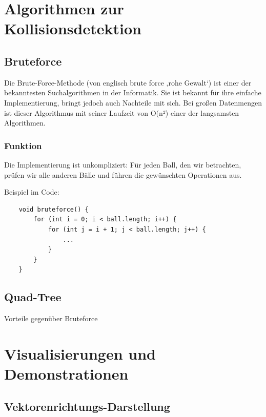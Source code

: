 \documentclass[12pt,a4paper]{article}
\begin{document}
		

		
	
	\section{Algorithmen zur Kollisionsdetektion}
	
\subsection{Bruteforce}

Die Brute-Force-Methode (von englisch brute force ‚rohe Gewalt‘) \cite{Bruteforce} ist einer der bekanntesten Suchalgorithmen in der Informatik. Sie ist bekannt für ihre einfache Implementierung, bringt jedoch auch Nachteile mit sich. Bei großen Datenmengen ist dieser Algorithmus mit seiner Laufzeit von  O(n²) einer der langsamsten Algorithmen.

\subsubsection{Funktion}

Die Implementierung ist unkompliziert: Für jeden Ball, den wir betrachten, prüfen wir alle anderen Bälle und führen die gewünschten Operationen aus.

\vspace{0.5cm}
Beispiel im Code:

\begin{verbatim}
	void bruteforce() {
		for (int i = 0; i < ball.length; i++) {
			for (int j = i + 1; j < ball.length; j++) {
				...
			}
		}
	}
\end{verbatim}
	
	
	
	
	
	
	
	
	\subsection{Quad-Tree}
	Vorteile gegenüber Bruteforce
	
	\section{Visualisierungen und Demonstrationen}
	
	\subsection{Vektorenrichtungs-Darstellung}
	
\end{document}
